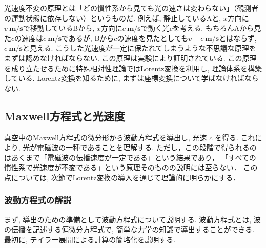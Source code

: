 \documentclass{ltjsarticle}
\begin{document}
光速度不変の原理とは「どの慣性系から見ても光の速さは変わらない」（観測者の運動状態に依存しない）というものだ. 
例えば, 静止しているAと, $x$方向に$v~\mathbf{m/s}$で移動しているBから, $x$方向に$c~\mathbf{m/s}$で動く光$c$を考える. 
もちろんAから見た$c$の速度は$c~\mathbf{m/s}$であるが, Bから$c$の速度を見たとしても$v + c ~\mathbf{m/s}$とはならず, $c~\mathbf{m/s}$と見える. 
こうした光速度が一定に保たれてしまうような不思議な原理をまずは認めなければならない. この原理は実験により証明されている. 
この原理を成り立たせるために特殊相対性理論ではLorentz変換を利用し, 理論体系を構築している. 
Lorentz変換を知るために, まずは座標変換について学ばなければならない. 



\subsection{Maxwell方程式と光速度}
真空中のMaxwell方程式の微分形から波動方程式を導出し, 光速 $c$ を得る. 
これにより, 光が電磁波の一種であることを理解する. 
ただし，この段階で得られるのはあくまで「電磁波の伝播速度が一定である」という結果であり，
「すべての慣性系で光速度が不変である」という原理そのものの説明には至らない．
この点については, 次節でLorentz変換の導入を通じて理論的に明らかにする．

\subsubsection{波動方程式の解説}
まず, 導出のための準備として波動方程式について説明する. 
波動方程式とは, 波の伝播を記述する偏微分方程式で, 簡単な力学の知識で導出することができる.
最初に, テイラー展開による計算の簡略化を説明する. 
\end{document}
